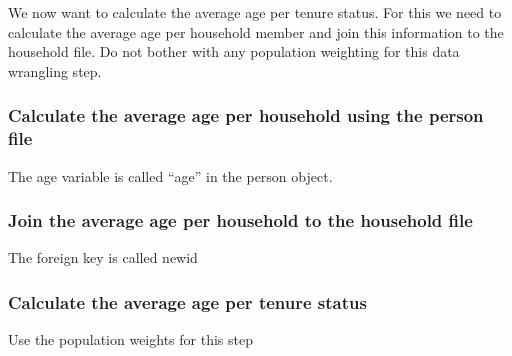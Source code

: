 \documentclass[
]{article}
\newenvironment{Shaded}{\begin{snugshade}}{\end{snugshade}}
\newcommand{\DataTypeTok}[1]{\textcolor[rgb]{0.13,0.29,0.53}{#1}}
\newcommand{\KeywordTok}[1]{\textcolor[rgb]{0.13,0.29,0.53}{\textbf{#1}}}
\newcommand{\NormalTok}[1]{#1}
\newcommand{\OperatorTok}[1]{\textcolor[rgb]{0.81,0.36,0.00}{\textbf{#1}}}
\newcommand{\StringTok}[1]{\textcolor[rgb]{0.31,0.60,0.02}{#1}}
\begin{document}
We now want to calculate the average age per tenure status. For this we
need to calculate the average age per household member and join this
information to the household file. Do not bother with any population
weighting for this data wrangling step.

\hypertarget{calculate-the-average-age-per-household-using-the-person-file}{%
\subsubsection{Calculate the average age per household using the person
file}\label{calculate-the-average-age-per-household-using-the-person-file}}

The age variable is called ``age'' in the person object.

\hypertarget{join-the-average-age-per-household-to-the-household-file}{%
\subsubsection{Join the average age per household to the household
file}\label{join-the-average-age-per-household-to-the-household-file}}

The foreign key is called newid

\hypertarget{calculate-the-average-age-per-tenure-status}{%
\subsubsection{Calculate the average age per tenure
status}\label{calculate-the-average-age-per-tenure-status}}

Use the population weights for this step

\begin{Shaded}
\end{Shaded}
\end{document}
